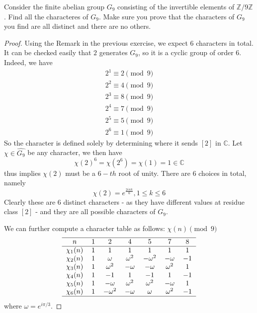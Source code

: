 \documentclass[11pt,letterpaper]{article}
\DeclareMathOperator{\1}{\mathbbm{1}}
\begin{document}
\begin{exercise}
  \label{ex3}
  Consider the finite abelian group $G_9$ consisting of the invertible elements of $\mathbb{Z}/9\mathbb{Z}$. Find all the characteres of $G_9$.
  Make sure you prove that the characters of $G_9$ you find are all distinct and there are no others.
\end{exercise}
\begin{proof}
  Using the Remark in the previous exercise, we expect $6$ characters in total. It can be checked easily that $2$ generates $G_9$, so it is a
  cyclic group of order $6$. Indeed, we have
  \begin{align*}
    2^1 \equiv 2 \pmod 9 \\
    2^2 \equiv 4 \pmod 9 \\
    2^3 \equiv 8 \pmod 9 \\
    2^4 \equiv 7 \pmod 9 \\
    2^5 \equiv 5 \pmod 9 \\
    2^6 \equiv 1 \pmod 9
  \end{align*}
  So the character is defined solely by determining where it sends $[2]$ in $\mathbb{C}$. Let $\chi \in \hat{G_9}$ be
  any character, we then have
  \[\chi(2)^6=\chi(2^6) = \chi(1) = 1 \in \mathbb{C}\]
  thus implies $\chi(2)$ must be a $6-th$ root of unity. There are $6$ choices in total, namely
  \[\chi(2) = e^{\frac{2i\pi k}{6}}, 1 \le k \le 6\]
  Clearly these are 6 distinct characters - as they have different values at residue class $[2]$ -  and they are all possible characters of $G_9$.

  We can further compute a character table as follows:
  $\chi(n)\pmod{9}$ \\
  \[\begin{tabular}{c c c c c c c }
      \hline
      $n$         & $1$ & $2$           & $4$          & $5$           & $7$          & $8$  \\
      \hline
      $\chi_1(n)$ & $1$ & $1$           & $1$          & $1$           & $1$          & $1$  \\
      $\chi_2(n)$ & $1$ & $\omega$      & $\omega^{2}$ & $-\omega^{2}$ & $-\omega$    & $-1$ \\
      $\chi_3(n)$ & $1$ & $\omega^{2}$  & $-\omega$    & $-\omega$     & $\omega^{2}$ & $1$  \\
      $\chi_4(n)$ & $1$ & $-1$          & $1$          & $-1$          & $1$          & $-1$ \\
      $\chi_5(n)$ & $1$ & $-\omega$     & $\omega^{2}$ & $\omega^{2}$  & $-\omega$    & $1$  \\
      $\chi_6(n)$ & $1$ & $-\omega^{2}$ & $-\omega$    & $\omega$      & $\omega^{2}$ & $-1$ \\
      \hline
    \end{tabular}\]
  where  $\omega = e^{i\pi/3}$.
\end{proof}
\end{document}

